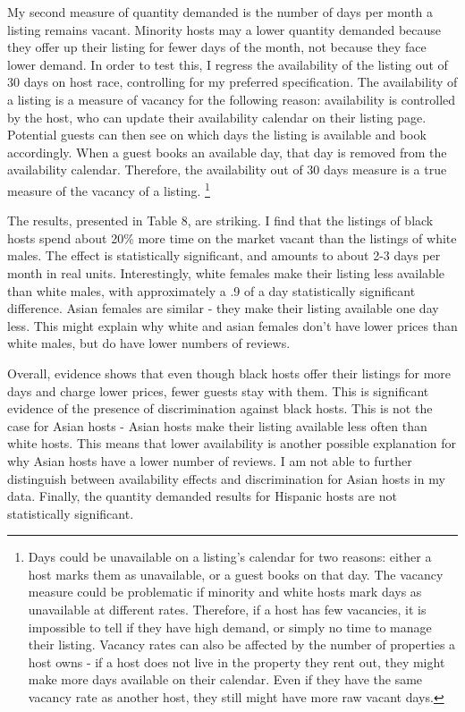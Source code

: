 My second measure of quantity demanded is the number of days per month a listing remains vacant. Minority hosts may a lower quantity demanded because they offer up their listing for fewer days of the month, not because they face lower demand. In order to test this, I regress the availability of the listing out of 30 days on host race, controlling for my preferred specification. The availability of a listing is a measure of vacancy for the following reason: availability is controlled by the host, who can update their availability calendar on their listing page. Potential guests can then see on which days the listing is available and book accordingly. When a guest books an available day, that day is removed from the availability calendar. Therefore, the availability out of 30 days measure is a true measure of the vacancy of a listing.%
	\footnote{Days could be unavailable on a listing's calendar for two reasons: either a host marks them as unavailable, or a guest books on that day. The vacancy measure could be problematic if minority and white hosts mark days as unavailable at different rates. Therefore, if a host has few vacancies, it is impossible to tell if they have high demand, or simply no time to manage their listing. Vacancy rates can also be affected by the number of properties a host owns - if a host does not live in the property they rent out, they might make more days available on their calendar. Even if they have the same vacancy rate as another host, they still might have more raw vacant days.}

The results, presented in Table 8, are striking. I find that the listings of black hosts spend about 20\% more time on the market vacant than the listings of white males. The effect is statistically significant, and amounts to about 2-3 days per month in real units. Interestingly, white females make their listing less available than white males, with approximately a .9 of a day statistically significant difference. Asian females are similar - they make their listing available one day less. This might explain why white and asian females don't have lower prices than white males, but do have lower numbers of reviews. 

Overall, evidence shows that even though black hosts offer their listings for more days and charge lower prices, fewer guests stay with them. This is significant evidence of the presence of discrimination against black hosts. This is not the case for Asian hosts - Asian hosts make their listing available less often than white hosts. This means that lower availability is another possible explanation for why Asian hosts have a lower number of reviews. I am not able to further distinguish between availability effects and discrimination for Asian hosts in my data. Finally, the quantity demanded results for Hispanic hosts are not statistically significant. 


